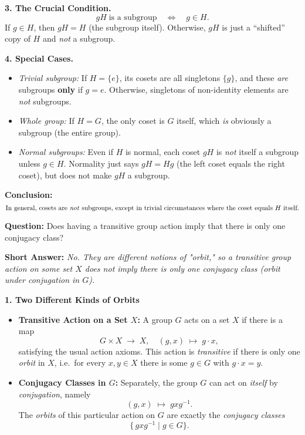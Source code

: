\documentclass[12pt]{article}
\theoremstyle{definition} %
\theoremstyle{plain} %
\begin{document}
\bigskip

\noindent
\textbf{3. The Crucial Condition.}
\[
  gH \;\text{is a subgroup} 
  \quad\Longleftrightarrow\quad
  g \in H.
\]
If $g \in H$, then $gH = H$ (the subgroup itself). Otherwise, $gH$ is just a “shifted” copy of $H$ and \emph{not} a subgroup.  

\bigskip

\noindent
\textbf{4. Special Cases.}
\begin{itemize}
    \item \emph{Trivial subgroup:} If $H = \{e\}$, its cosets are all singletons $\{g\}$, and these \emph{are} subgroups \textbf{only} if $g = e$. Otherwise, singletons of non-identity elements are \emph{not} subgroups.
    \item \emph{Whole group:} If $H = G$, the only coset is $G$ itself, which \emph{is} obviously a subgroup (the entire group).
    \item \emph{Normal subgroups:} Even if $H$ is normal, each coset $gH$ is \emph{not} itself a subgroup unless $g \in H$. Normality just says $gH = Hg$ (the left coset equals the right coset), but does not make $gH$ a subgroup.
\end{itemize}

\bigskip

\noindent
\textbf{Conclusion:} 
\[
\text{In general, cosets are \emph{not} subgroups, except in trivial circumstances where the coset equals }H\text{ itself.}
\]

\noindent
\textbf{Question:} Does having a transitive group action imply that there is only one conjugacy class?

\bigskip

\noindent
\textbf{Short Answer:} \emph{No. They are different notions of "orbit," so a transitive group action on \textit{some set} $X$ does not imply there is only one conjugacy class (orbit under conjugation in $G$).}

\bigskip

\noindent
\textbf{1. Two Different Kinds of Orbits}

\begin{itemize}
    \item \textbf{Transitive Action on a Set $X$:} 
    A group $G$ acts on a set $X$ if there is a map 
    \[
       G \times X \;\to\; X, \quad (g,x) \;\mapsto\; g\cdot x,
    \]
    satisfying the usual action axioms.  This action is \emph{transitive} if there is only one \emph{orbit} in $X$, i.e.\ for every $x,y \in X$ there is some $g \in G$ with $g\cdot x = y$.

    \item \textbf{Conjugacy Classes in $G$:}
    Separately, the group $G$ can act on \emph{itself} by \emph{conjugation}, namely
    \[
       (g,x)\;\mapsto\; gxg^{-1}.
    \]
    The \emph{orbits} of this particular action on $G$ are exactly the \emph{conjugacy classes}
    \[
      \{\,g x g^{-1} \mid g \in G\}.
    \]
\end{itemize}
\end{document}
